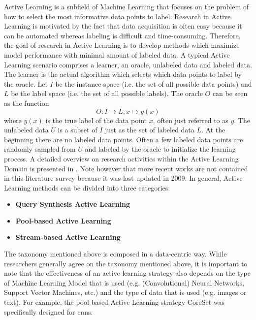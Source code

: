 Active Learning is a subfield of Machine Learning that focuses on the problem of how to select the most informative data points to label.
Research in Active Learning is motivated by the fact that data acquisition is often easy because it can be automated whereas labeling is
difficult and time-consuming. Therefore, the goal of research in Active Learning is to develop methods which maximize model performance
with minimal amount of labeled data. A typical Active Learning scenario comprises a learner, an oracle, unlabeled data and labeled data.
The learner is the actual algorithm which selects which data points to label by the oracle. Let $I$ be the instance space (i.e. the set
of all possible data points) and $L$ be the label space (i.e. the set of all possible labels). The oracle $O$ can be seen as the function
\begin{equation}
    O: I \rightarrow L, x \mapsto y(x)
\end{equation}
where $y(x)$ is the true label of the data point $x$, often just referred to as $y$. The unlabeled data $U$ is a subset of $I$ just as the set
of labeled data $L$. At the beginning there are no labeled data points. Often a few labeled data points are randomly sampled from $U$ and labeled
by the oracle to initialize the learning process. A detailed overview on research activities within the Active Learning Domain is presented in
\cite{settles2009active}. Note however that more recent works are not contained in this literature survey because it was last updated in 2009.
In general, Active Learning methods can be divided into three categories:
\begin{itemize}
    \item \textbf{Query Synthesis Active Learning}
    \item \textbf{Pool-based Active Learning}
    \item \textbf{Stream-based Active Learning}
\end{itemize}
The taxonomy mentioned above is composed in a data-centric way. While researchers generally agree on the taxonomy mentioned above,
it is important to note that the effectiveness of an active learning strategy also depends on the type of Machine Learning Model that is used
(e.g. (Convolutional) Neural Networks, Support Vector Machines, etc.) and the type of data that is used (e.g. images or text).
For example, the pool-based Active Learning strategy CoreSet \cite{sener2017active} was specifically designed for \glspl{cnn}.

